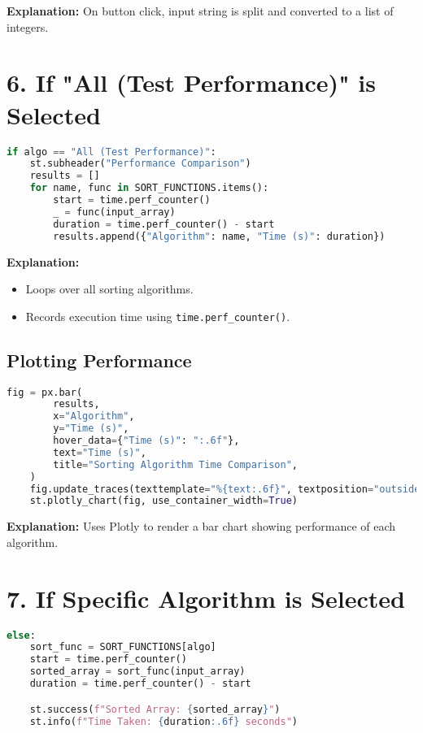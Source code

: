 \documentclass[14pt]{extarticle}
\begin{document}
\textbf{Explanation:} On button click, input string is split and converted to a list of integers.

\newpage
\section*{6. If "All (Test Performance)" is Selected}
\begin{lstlisting}[language=Python]
if algo == "All (Test Performance)":
    st.subheader("Performance Comparison")
    results = []
    for name, func in SORT_FUNCTIONS.items():
        start = time.perf_counter()
        _ = func(input_array)
        duration = time.perf_counter() - start
        results.append({"Algorithm": name, "Time (s)": duration})
\end{lstlisting}

\textbf{Explanation:} 
\begin{itemize}
  \item Loops over all sorting algorithms.
  \item Records execution time using \texttt{time.perf\_counter()}.
\end{itemize}

\subsection*{Plotting Performance}
\begin{lstlisting}[language=Python]
    fig = px.bar(
        results,
        x="Algorithm",
        y="Time (s)",
        hover_data={"Time (s)": ":.6f"},
        text="Time (s)",
        title="Sorting Algorithm Time Comparison",
    )
    fig.update_traces(texttemplate="%{text:.6f}", textposition="outside")
    st.plotly_chart(fig, use_container_width=True)
\end{lstlisting}

\textbf{Explanation:} Uses Plotly to render a bar chart showing performance of each algorithm.

\newpage
\section*{7. If Specific Algorithm is Selected}
\begin{lstlisting}[language=Python]
else:
    sort_func = SORT_FUNCTIONS[algo]
    start = time.perf_counter()
    sorted_array = sort_func(input_array)
    duration = time.perf_counter() - start

    st.success(f"Sorted Array: {sorted_array}")
    st.info(f"Time Taken: {duration:.6f} seconds")
\end{lstlisting}
\end{document}
